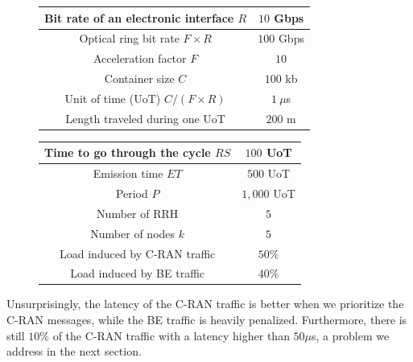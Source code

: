 \documentclass[10pt, conference, letterpaper]{IEEEtran}
\newcommand{\todo}[1]{{\color{red} TODO: {#1}}}
\begin{document}
\begin{figure}[h]
\begin{minipage}[t]{.46\linewidth}
  \scalebox{.55}
  {
  \begin{tabular}{|c|c|}
  \hline
  Bit rate of an electronic interface $R$ & $10$ Gbps \tabularnewline
  \hline
  Optical ring bit rate $F\times R$ & $100$ Gbps \tabularnewline
  \hline
    Acceleration factor $F$ & $10$  \tabularnewline
  \hline
  Container size  $C$ & $100$ kb  \tabularnewline
  \hline
  Unit of time (UoT) $C/(F\times R)$ & $1~\mu$s \tabularnewline
  \hline
  Length traveled during one UoT & $200$ m \tabularnewline
  \hline
    \end{tabular}
  }

\end{minipage} %
\begin{minipage}[t]{.46\linewidth}
   \scalebox{.55}
  {
  \begin{tabular}{|c|c|}
  \hline
  Time to go through the cycle $RS$ & $100$ UoT \tabularnewline
  \hline
  Emission time $ET$ & $500$ UoT \tabularnewline
  \hline
   Period $P$ & $1,000$ UoT \tabularnewline
  \hline
  Number of RRH & $5$  \tabularnewline
  \hline
  Number of nodes $k$ & $5$  \tabularnewline
  \hline
   Load induced by C-RAN traffic & $50\%$  \tabularnewline
  \hline
    Load induced by BE traffic & $40\%$  \tabularnewline
  \hline
  \end{tabular}
}
\end{minipage}
  \label{fig:params}
\end{figure}



Unsurprisingly, the latency of the C-RAN traffic is better when we prioritize the C-RAN messages, while the BE traffic is heavily penalized. Furthermore, there is still $10\%$ of the C-RAN traffic with a latency higher than $50 \mu$s, a problem we address in the next section.

\end{document}
